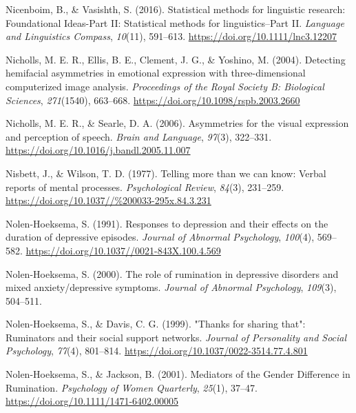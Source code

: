 \documentclass[a4paper,12pt,twoside,onecolumn,openright,final,oldfontcommands]{memoir}
\begin{document}
\leavevmode\hypertarget{ref-nicenboim_statistical_2016}{}%
Nicenboim, B., \& Vasishth, S. (2016). Statistical methods for linguistic research: Foundational Ideas-Part II: Statistical methods for linguistics--Part II. \emph{Language and Linguistics Compass}, \emph{10}(11), 591--613. \url{https://doi.org/10.1111/lnc3.12207}

\leavevmode\hypertarget{ref-nicholls_detecting_2004}{}%
Nicholls, M. E. R., Ellis, B. E., Clement, J. G., \& Yoshino, M. (2004). Detecting hemifacial asymmetries in emotional expression with three-dimensional computerized image analysis. \emph{Proceedings of the Royal Society B: Biological Sciences}, \emph{271}(1540), 663--668. \url{https://doi.org/10.1098/rspb.2003.2660}

\leavevmode\hypertarget{ref-nicholls_asymmetries_2006}{}%
Nicholls, M. E. R., \& Searle, D. A. (2006). Asymmetries for the visual expression and perception of speech. \emph{Brain and Language}, \emph{97}(3), 322--331. \url{https://doi.org/10.1016/j.bandl.2005.11.007}

\leavevmode\hypertarget{ref-nisbett_telling_1977}{}%
Nisbett, J., \& Wilson, T. D. (1977). Telling more than we can know: Verbal reports of mental processes. \emph{Psychological Review}, \emph{84}(3), 231--259. \url{https://doi.org/10.1037//\%200033-295x.84.3.231}

\leavevmode\hypertarget{ref-nolen-hoeksema_responses_1991}{}%
Nolen-Hoeksema, S. (1991). Responses to depression and their effects on the duration of depressive episodes. \emph{Journal of Abnormal Psychology}, \emph{100}(4), 569--582. \url{https://doi.org/10.1037//0021-843X.100.4.569}

\leavevmode\hypertarget{ref-Nolen-Hoeksema2000}{}%
Nolen-Hoeksema, S. (2000). The role of rumination in depressive disorders and mixed anxiety/depressive symptoms. \emph{Journal of Abnormal Psychology}, \emph{109}(3), 504--511.

\leavevmode\hypertarget{ref-nolen-hoeksema_thanks_1999}{}%
Nolen-Hoeksema, S., \& Davis, C. G. (1999). "Thanks for sharing that": Ruminators and their social support networks. \emph{Journal of Personality and Social Psychology}, \emph{77}(4), 801--814. \url{https://doi.org/10.1037/0022-3514.77.4.801}

\leavevmode\hypertarget{ref-nolen-hoeksema_mediators_2001}{}%
Nolen-Hoeksema, S., \& Jackson, B. (2001). Mediators of the Gender Difference in Rumination. \emph{Psychology of Women Quarterly}, \emph{25}(1), 37--47. \url{https://doi.org/10.1111/1471-6402.00005}
\end{document}
